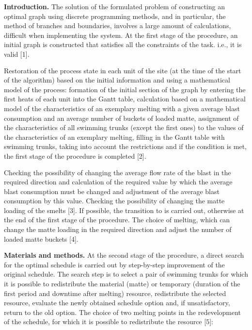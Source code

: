 \begin{multicols}{2}
{\bfseries Introduction.} The solution of the formulated problem of
constructing an optimal graph using discrete programming methods, and in
particular, the method of branches and boundaries, involves a large
amount of calculations, difficult when implementing the system. At the
first stage of the procedure, an initial graph is constructed that
satisfies all the constraints of the task. i.e., it is valid {[}1{]}.

Restoration of the process state in each unit of the site (at the time
of the start of the algorithm) based on the initial information and
using a mathematical model of the process: formation of the initial
section of the graph by entering the first heats of each unit into the
Gantt table, calculation based on a mathematical model of the
characteristics of an exemplary melting with a given average blast
consumption and an average number of buckets of loaded matte, assignment
of the characteristics of all swimming trunks (except the first ones) to
the values of the characteristics of an exemplary melting, filling in
the Gantt table with swimming trunks, taking into account the
restrictions and if the condition is met, the first stage of the
procedure is completed {[}2{]}.

Checking the possibility of changing the average flow rate of the blast
in the required direction and calculation of the required value by which
the average blast consumption must be changed and adjustment of the
average blast consumption by this value. Checking the possibility of
changing the matte loading of the smelts {[}3{]}. If possible, the
transition to is carried out, otherwise at the end of the first stage of
the procedure. The choice of melting, which can change the matte loading
in the required direction and adjust the number of loaded matte buckets
{[}4{]}.

{\bfseries Materials and methods.} At the second stage of the procedure, a
direct search for the optimal schedule is carried out by step-by-step
improvement of the original schedule. The search step is to select a
pair of swimming trunks for which it is possible to redistribute the
material (matte) or temporary (duration of the first period and downtime
after melting) resource, redistribute the selected resource, evaluate
the newly obtained schedule option and, if unsatisfactory, return to the
old option. The choice of two melting points in the redevelopment of the
schedule, for which it is possible to redistribute the resource {[}5{]}:


\end{multicols}
